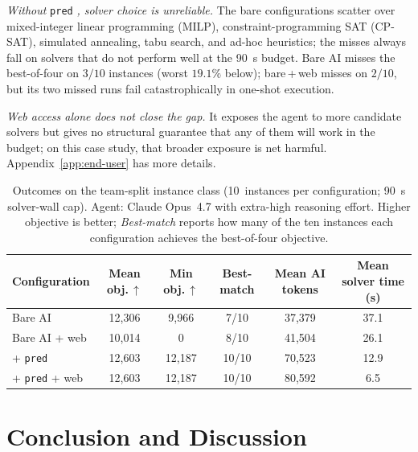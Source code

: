\documentclass{article}
\begin{document}
\emph{Without} \texttt{pred} \emph{, solver choice is unreliable.} The bare configurations scatter over mixed-integer linear programming (MILP), constraint-programming SAT (CP-SAT), simulated annealing, tabu search, and ad-hoc heuristics; the misses always fall on solvers that do not perform well at the 90~s budget. Bare AI misses the best-of-four on $3/10$ instances (worst $19.1\%$ below); bare\,+\,web misses on $2/10$, but its two missed runs fail catastrophically in one-shot execution.

\emph{Web access alone does not close the gap.} It exposes the agent to more candidate solvers but gives no structural guarantee that any of them will work in the budget; on this case study, that broader exposure is net harmful. Appendix~\ref{app:end-user} has more details.

\begin{table}[h]
\caption{Outcomes on the team-split instance class (10~instances per configuration; 90~s solver-wall cap). Agent: Claude Opus~4.7 with extra-high reasoning effort.
Higher objective is better; \emph{Best-match} reports how many of the ten instances each configuration achieves the best-of-four objective.}
\label{tab:end-user-eval}
\centering
\small
\begin{tabular}{@{}lccccc@{}}
\toprule
Configuration & Mean obj.\,$\uparrow$ & Min obj.\,$\uparrow$ & Best-match & Mean AI tokens & Mean solver time (s) \\
\midrule
Bare AI                              & 12{,}306 & 9{,}966 & 7/10  & 37{,}379 & 37.1 \\
Bare AI + web                        & 10{,}014 & 0       & 8/10  & 41{,}504 & 26.1 \\
+ \texttt{pred}                      & 12{,}603 & 12{,}187 & 10/10 & 70{,}523 & 12.9 \\
+ \texttt{pred} + web                & 12{,}603 & 12{,}187 & 10/10 & 80{,}592 &  6.5 \\
\bottomrule
\end{tabular}
\end{table}

\section{Conclusion and Discussion}\label{sec:conclusion}
\end{document}
